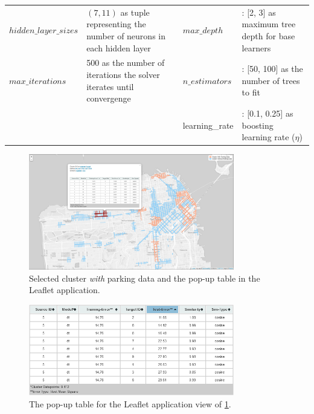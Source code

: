 \begin{table}
{\begin{tabular}{lp{4cm}lp{4cm}}
				$hidden\_layer\_sizes$ & $(7, 11)$ as tuple representing the number of neurons in each hidden layer & $max\_depth$ & : [2, 3] as maximum tree depth for base learners \\
				
				$max\_iterations$ & 500 as the number of iterations the solver iterates until convergenge & $n\_estimators$ & : [50, 100] as the number of trees to fit\\
				
				& & learning\_rate & : [0.1, 0.25] as boosting learning rate ($\eta$)
				
				\botrule
		\end{tabular}}
		\label{tab:ml_params}
	\end{table}
	
	\begin{figure}[!ht]
		\centering
		\includegraphics[width=0.8\textwidth]{graphics/cwith_source_dt_cosine.png}
		\caption{Selected cluster \textit{with} parking data and the pop-up table in the Leaflet application.}
		\label{fig:cwith}
	\end{figure}
	
	\begin{figure}[!ht]
		\centering
		\includegraphics[width=0.8\textwidth]{graphics/cwith_source_dt_cosine_table.png}
		\caption{The pop-up table for the Leaflet application view of \cref{fig:cwith}.}
		\label{fig:cwith_table}
	\end{figure}
	
